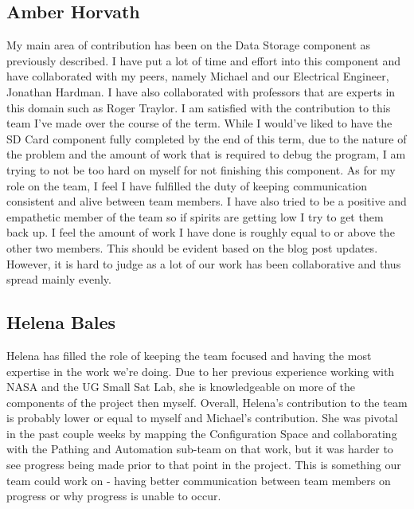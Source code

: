 \documentclass[letterpaper,10pt]{article}
\begin{document}
\subsection{Amber Horvath}
My main area of contribution has been on the Data Storage component as previously described.
I have put a lot of time and effort into this component and have collaborated with my peers,
namely Michael and our Electrical Engineer, Jonathan Hardman. I have also collaborated
with professors that are experts in this domain such as Roger Traylor. I am satisfied with the 
contribution to this team I've made over the course of the term. While I would've liked to
have the SD Card component fully completed by the end of this term, due to the nature of the
problem and the amount of work that is required to debug the program, I am trying to not be too hard on
 myself for not finishing this component. As for my role on the team, I feel I have fulfilled the duty of 
 keeping communication consistent and alive between team members. I have also tried to be a positive
 and empathetic member of the team so if spirits are getting low I try to get them back up. I feel
 the amount of work I have done is roughly equal to or above the other two members. This
 should be evident based on the blog post updates. However, it is hard to judge as a lot of our
 work has been collaborative and thus spread mainly evenly.
 \subsection{Helena Bales}
 Helena has filled the role of keeping the team focused and having the most expertise in the work
 we're doing. Due to her previous experience working with NASA and the UG Small Sat Lab, she
 is knowledgeable on more of the components of the project then myself. Overall, Helena's contribution
 to the team is probably lower or equal to myself and Michael's contribution. She was pivotal in the
 past couple weeks by mapping the Configuration Space and collaborating with the Pathing and
 Automation sub-team on that work, but it was harder to see progress being made prior to that point
 in the project. This is something our team could work on - having better communication between team
 members on progress or why progress is unable to occur.
\end{document}
